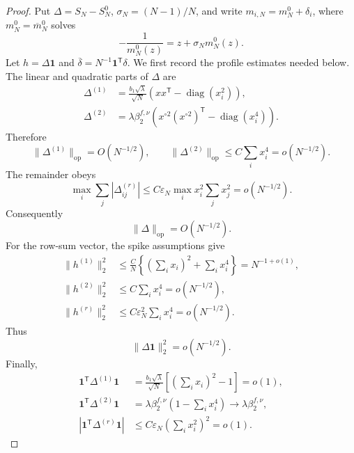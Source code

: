 \documentclass[10pt,a4paper]{amsart}
\newcommand{\diag}{\operatorname{diag}}
\newcommand{\op}{\mathrm{op}}
\newcommand{\one}{\mathbf 1}
\newcommand{\norm}[1]{\lVert #1\rVert}
\begin{document}
\begin{proof}
Put \(\Delta=S_N-S_N^0\),
\(\sigma_N=(N-1)/N\), and write
\(m_{i,N}=m_N^0+\delta_i\), where \(m_N^0=\overline m_N^0\) solves
\begin{equation}\label{eq:R3-finite-flat-QVE}
 -\frac1{m_N^0(z)}=z+\sigma_Nm_N^0(z).
\end{equation}
Let \(h=\Delta\one\) and
\(\overline\delta=N^{-1}\one^{\mathsf T}\delta\).  We first record the
profile estimates needed below.  The linear and quadratic parts of
\(\Delta\) are
\begin{align*}
 \Delta^{(1)}
 &=\frac{b_1\sqrt\lambda}{\sqrt N}
 \left(xx^{\mathsf T}-\diag(x_i^2)\right),\\
 \Delta^{(2)}
 &=\lambda\beta_2^{f,\nu}
 \left(x^{\circ2}(x^{\circ2})^{\mathsf T}-\diag(x_i^4)\right).
\end{align*}
Therefore
\[
 \norm{\Delta^{(1)}}_{\op}=O(N^{-1/2}),
 \qquad
 \norm{\Delta^{(2)}}_{\op}
 \le C\sum_i x_i^4=o(N^{-1/2}).
\]
The remainder obeys
\[
 \max_i\sum_j|\Delta^{(r)}_{ij}|
 \le C\varepsilon_N\max_i x_i^2\sum_jx_j^2
 =o(N^{-1/2}).
\]
Consequently
\begin{equation}\label{eq:R3-Delta-op}
 \norm\Delta_{\op}=O(N^{-1/2}).
\end{equation}
For the row-sum vector, the spike assumptions give
\begin{align*}
 \norm{h^{(1)}}_2^2
 &\le\frac C N
 \left\{\left(\sum_i x_i\right)^2+\sum_i x_i^4\right\}
 =N^{-1+o(1)},\\
 \norm{h^{(2)}}_2^2
 &\le C\sum_i x_i^4=o(N^{-1/2}),\\
 \norm{h^{(r)}}_2^2
 &\le C\varepsilon_N^2\sum_i x_i^4=o(N^{-1/2}).
\end{align*}
Thus
\begin{equation}\label{eq:R3-Delta-one}
 \norm{\Delta\one}_2^2=o(N^{-1/2}).
\end{equation}
Finally,
\begin{align}
 \one^{\mathsf T}\Delta^{(1)}\one
 &=\frac{b_1\sqrt\lambda}{\sqrt N}
 \left[\left(\sum_i x_i\right)^2-1\right]=o(1),
 \nonumber\\
 \one^{\mathsf T}\Delta^{(2)}\one
 &=\lambda\beta_2^{f,\nu}
 \left(1-\sum_i x_i^4\right)
 \longrightarrow\lambda\beta_2^{f,\nu},
 \nonumber\\
 |\one^{\mathsf T}\Delta^{(r)}\one|
 &\le C\varepsilon_N\left(\sum_i x_i^2\right)^2=o(1).
 \label{eq:R3-Delta-mass}
\end{align}


\end{proof}
\end{document}
